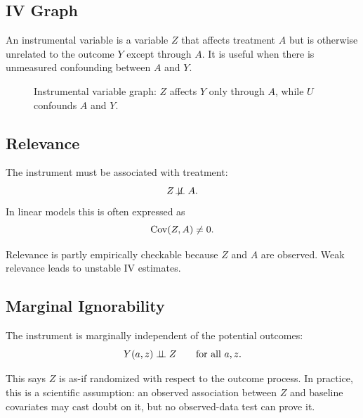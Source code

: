 \label{lec:9-5}

\subsection{IV Graph}

An instrumental variable is a variable $Z$ that affects treatment $A$ but is
otherwise unrelated to the outcome $Y$ except through $A$. It is useful when
there is unmeasured confounding between $A$ and $Y$.

\begin{figure}[H]
\centering
{}
\caption{Instrumental variable graph: $Z$ affects $Y$ only through $A$, while $U$ confounds $A$ and $Y$.}
\label{fig:ch9-iv-graph}
\end{figure}

\subsection{Relevance}

\begin{assumptionbox}
The instrument must be associated with treatment:
\[
  Z \not\!\perp\!\!\!\perp A.
\]
In linear models this is often expressed as
\[
  \operatorname{Cov}(Z,A)\ne 0.
\]
\end{assumptionbox}

Relevance is partly empirically checkable because $Z$ and $A$ are observed.
Weak relevance leads to unstable IV estimates.

\subsection{Marginal Ignorability}

\begin{assumptionbox}
The instrument is marginally independent of the potential outcomes:
\[
  Y(a,z)\perp\!\!\!\perp Z
  \qquad\text{for all }a,z.
\]
\end{assumptionbox}

This says $Z$ is as-if randomized with respect to the outcome process. In
practice, this is a scientific assumption: an observed association between $Z$
and baseline covariates may cast doubt on it, but no observed-data test can
prove it.

